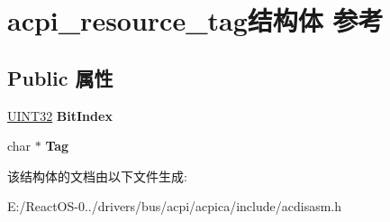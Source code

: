 \hypertarget{structacpi__resource__tag}{}\section{acpi\+\_\+resource\+\_\+tag结构体 参考}
\label{structacpi__resource__tag}
\subsection*{Public 属性}
\begin{DoxyCompactItemize}
\item 
\mbox{\label{structacpi__resource__tag_a0230e531fda7e4d95528a8cc8fda4845}} 
\hyperlink{_processor_bind_8h_ae1e6edbbc26d6fbc71a90190d0266018}{U\+I\+N\+T32} {\bfseries Bit\+Index}
\item 
\mbox{\label{structacpi__resource__tag_a1723bd4e37fba0225a91b9828e69659d}} 
char $\ast$ {\bfseries Tag}
\end{DoxyCompactItemize}


该结构体的文档由以下文件生成\+:\begin{DoxyCompactItemize}
\item 
E\+:/\+React\+O\+S-\/0../drivers/bus/acpi/acpica/include/acdisasm.\+h\end{DoxyCompactItemize}
